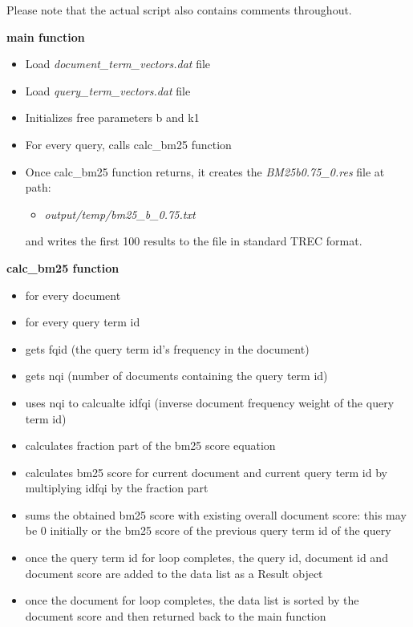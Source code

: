 \documentclass{article} %
\begin{document}
Please note that the actual script also contains comments throughout.

\textbf{main function}

\begin{itemize}
    \item Load \textit{document\_term\_vectors.dat} file
    \item Load \textit{query\_term\_vectors.dat} file
    \item Initializes free parameters b and k1
    \item For every query, calls calc\_bm25 function
    \item Once calc\_bm25 function returns, it creates the \textit{BM25b0.75\_0.res} file at path:
    \begin{itemize}
        \item \textit{output/temp/bm25\_b\_0.75.txt}    
    \end{itemize}
    and writes the first 100 results to the file in standard TREC format.
\end{itemize}


\textbf{calc\_bm25 function}

\begin{itemize}
    \item for every document
    \item for every query term id
    \item gets fqid (the query term id's frequency in the document)
    \item gets nqi (number of documents containing the query term id)
    \item uses nqi to calcualte idfqi (inverse document frequency weight of the query term id)
    \item calculates fraction part of the bm25 score equation
    \item calculates bm25 score for current document and current query term id by multiplying idfqi by the fraction part
    \item sums the obtained bm25 score with existing overall document score: this may be 0 initially or the bm25 score of the previous query term id of the query
    \item once the query term id for loop completes, the query id, document id and document score are added to the data list as a Result object
    \item once the document for loop completes, the data list is sorted by the document score and then returned back to the main function
\end{itemize}
\end{document}

